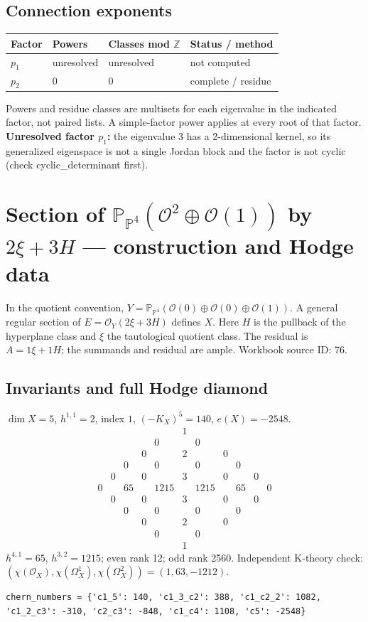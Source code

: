 \documentclass[10pt,a4paper]{article}
\begin{document}
\subsection*{Connection exponents}
\begin{center}\begin{tabular}{llll}\toprule Factor & Powers & Classes mod $\mathbb Z$ & Status / method\\\midrule
$p_{1}$ & unresolved & unresolved & not computed\\
$p_{2}$ & $0$ & $0$ & complete / residue\\
\bottomrule\end{tabular}\end{center}
Powers and residue classes are multisets for each eigenvalue in the indicated factor, not paired lists. A simple-factor power applies at every root of that factor.
\textbf{Unresolved factor $p_{1}$:} the eigenvalue 3 has a 2-dimensional kernel, so its generalized eigenspace is not a single Jordan block and the factor is not cyclic (check cyclic\_determinant first).
\clearpage\section*{Section of $\mathbb P_{\mathbb P^{4}}(\mathcal O^{2}\oplus \mathcal O(1))$ by $2\xi +3H$ --- construction and Hodge data}\label{entry:PB5-076}
In the quotient convention, $Y=\mathbb P_{\mathbb P^{4}}(\mathcal O(0)\oplus\mathcal O(0)\oplus\mathcal O(1))$.
A general regular section of $E=\mathcal O_Y(2\xi+3H)$ defines $X$.
Here $H$ is the pullback of the hyperplane class and $\xi$ the tautological quotient class. The residual is $A=1\xi+1H$; the summands and residual are ample.
Workbook source ID: 76.
\subsection*{Invariants and full Hodge diamond}
$\dim X=5$, $h^{1,1}=2$, index $1$, $(-K_X)^5=140$, $e(X)=-2548$.
\[\begin{array}{ccccccccccc}&&&&&1&&&&&\\&&&&0&&0&&&&\\&&&0&&2&&0&&&\\&&0&&0&&0&&0&&\\&0&&0&&3&&0&&0&\\0&&65&&1215&&1215&&65&&0\\&0&&0&&3&&0&&0&\\&&0&&0&&0&&0&&\\&&&0&&2&&0&&&\\&&&&0&&0&&&&\\&&&&&1&&&&&\end{array}\]
$h^{4,1}=65$, $h^{3,2}=1215$; even rank 12; odd rank 2560.
Independent K-theory check: $(\chi(\mathcal O_X),\chi(\Omega_X^1),\chi(\Omega_X^2))=(1, 63, -1212)$.
\begin{lstlisting}
chern_numbers = {'c1_5': 140, 'c1_3_c2': 388, 'c1_c2_2': 1082, 'c1_2_c3': -310, 'c2_c3': -848, 'c1_c4': 1108, 'c5': -2548}
\end{lstlisting}
\end{document}
